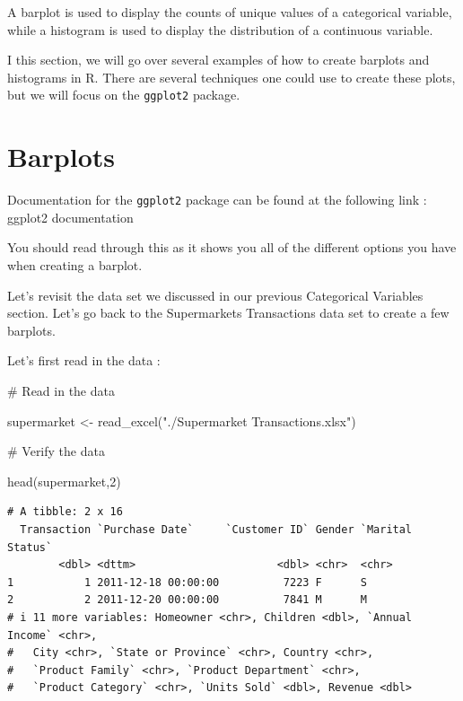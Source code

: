 \documentclass[
  letterpaper,
  DIV=11,
  numbers=noendperiod]{scrreprt}
\newenvironment{Shaded}{\begin{snugshade}}{\end{snugshade}}
\newcommand{\CommentTok}[1]{\textcolor[rgb]{0.37,0.37,0.37}{#1}}
\newcommand{\DecValTok}[1]{\textcolor[rgb]{0.68,0.00,0.00}{#1}}
\newcommand{\FunctionTok}[1]{\textcolor[rgb]{0.28,0.35,0.67}{#1}}
\newcommand{\NormalTok}[1]{\textcolor[rgb]{0.00,0.23,0.31}{#1}}
\newcommand{\OtherTok}[1]{\textcolor[rgb]{0.00,0.23,0.31}{#1}}
\newcommand{\StringTok}[1]{\textcolor[rgb]{0.13,0.47,0.30}{#1}}
\begin{document}
A barplot is used to display the counts of unique values of a
categorical variable, while a histogram is used to display the
distribution of a continuous variable.

I this section, we will go over several examples of how to create
barplots and histograms in R. There are several techniques one could use
to create these plots, but we will focus on the \texttt{ggplot2}
package.

\section*{Barplots}\label{barplots}


Documentation for the \texttt{ggplot2} package can be found at the
following link : ggplot2 documentation

You should read through this as it shows you all of the different
options you have when creating a barplot.

Let's revisit the data set we discussed in our previous Categorical
Variables section. Let's go back to the Supermarkets Transactions data
set to create a few barplots.

Let's first read in the data :

\begin{Shaded}
\begin{Highlighting}[]
\CommentTok{\# Read in the data}

\NormalTok{supermarket }\OtherTok{\textless{}{-}} \FunctionTok{read\_excel}\NormalTok{(}\StringTok{"./Supermarket Transactions.xlsx"}\NormalTok{)}

\CommentTok{\# Verify the data}

\FunctionTok{head}\NormalTok{(supermarket,}\DecValTok{2}\NormalTok{)}
\end{Highlighting}
\end{Shaded}

\begin{verbatim}
# A tibble: 2 x 16
  Transaction `Purchase Date`     `Customer ID` Gender `Marital Status`
        <dbl> <dttm>                      <dbl> <chr>  <chr>           
1           1 2011-12-18 00:00:00          7223 F      S               
2           2 2011-12-20 00:00:00          7841 M      M               
# i 11 more variables: Homeowner <chr>, Children <dbl>, `Annual Income` <chr>,
#   City <chr>, `State or Province` <chr>, Country <chr>,
#   `Product Family` <chr>, `Product Department` <chr>,
#   `Product Category` <chr>, `Units Sold` <dbl>, Revenue <dbl>
\end{verbatim}
\end{document}
